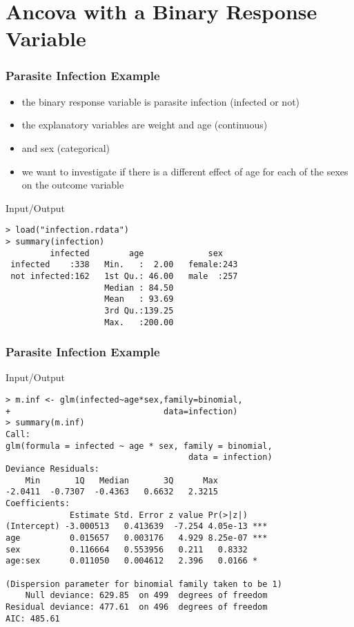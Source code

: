 \section[Binomial Ancova]{Ancova with a Binary Response Variable }

\begin{frame}[fragile]\frametitle{Parasite Infection Example}
\begin{itemize}
\item the binary response variable is parasite infection (infected or not) 
\item the explanatory variables are weight and age (continuous) 
\item and sex (categorical)
\item we want to investigate if there is a different effect of age for each of the sexes on the outcome variable
\end{itemize}
\begin{exampleblock}{Input/Output}\footnotesize
\begin{verbatim}
> load("infection.rdata")
> summary(infection)
         infected        age             sex     
 infected    :338   Min.   :  2.00   female:243  
 not infected:162   1st Qu.: 46.00   male  :257  
                    Median : 84.50               
                    Mean   : 93.69               
                    3rd Qu.:139.25               
                    Max.   :200.00               
\end{verbatim}
\end{exampleblock}

\end{frame}


\begin{frame}[fragile]\frametitle{Parasite Infection Example}\footnotesize
  \begin{exampleblock}{Input/Output}\scriptsize
\begin{verbatim}
> m.inf <- glm(infected~age*sex,family=binomial,
+                               data=infection)
> summary(m.inf)
Call:
glm(formula = infected ~ age * sex, family = binomial, 
                                     data = infection)
Deviance Residuals: 
    Min       1Q   Median       3Q      Max  
-2.0411  -0.7307  -0.4363   0.6632   2.3215  
Coefficients:
             Estimate Std. Error z value Pr(>|z|)    
(Intercept) -3.000513   0.413639  -7.254 4.05e-13 ***
age          0.015657   0.003176   4.929 8.25e-07 ***
sex          0.116664   0.553956   0.211   0.8332    
age:sex      0.011050   0.004612   2.396   0.0166 *  

(Dispersion parameter for binomial family taken to be 1)
    Null deviance: 629.85  on 499  degrees of freedom
Residual deviance: 477.61  on 496  degrees of freedom
AIC: 485.61
\end{verbatim}
  \end{exampleblock}

\end{frame}

